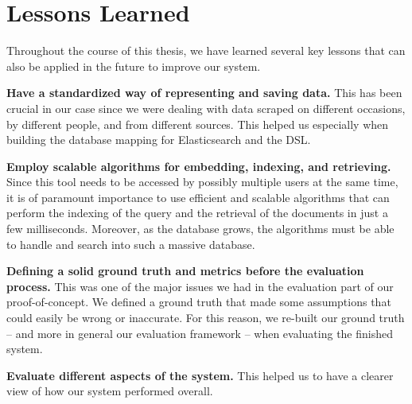 \section{Lessons Learned}\label{sec:lessons-learned}
Throughout the course of this thesis, we have learned several key lessons that can also be applied in the future to improve our system.

\begin{description}
    \item \textbf{Have a standardized way of representing and saving data.} This has been crucial in our case since we were dealing with data scraped on different occasions, by different people, and from different sources.
    This helped us especially when building the database mapping for Elasticsearch and the DSL\@.
    \item \textbf{Employ scalable algorithms for embedding, indexing, and retrieving.} Since this tool needs to be accessed by possibly multiple users at the same time, it is of paramount importance to use efficient and scalable algorithms that can perform the indexing of the query and the retrieval of the documents in just a few milliseconds.
    Moreover, as the database grows, the algorithms must be able to handle and search into such a massive database.
    \item \textbf{Defining a solid ground truth and metrics before the evaluation process.} This was one of the major issues we had in the evaluation part of our proof-of-concept.
    We defined a ground truth that made some assumptions that could easily be wrong or inaccurate.
    For this reason, we re-built our ground truth -- and more in general our evaluation framework -- when evaluating the finished system.
    \item \textbf{Evaluate different aspects of the system.} This helped us to have a clearer view of how our system performed overall.
\end{description}

